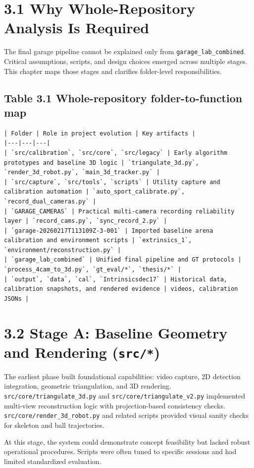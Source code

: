 \section{3.1 Why Whole-Repository Analysis Is Required}
The final garage pipeline cannot be explained only from \texttt{garage\_lab\_combined}. Critical assumptions, scripts, and design choices emerged across multiple stages. This chapter maps those stages and clarifies folder-level responsibilities.

\subsection{Table 3.1 Whole-repository folder-to-function map}
\begin{verbatim}
| Folder | Role in project evolution | Key artifacts |
|---|---|---|
| `src/calibration`, `src/core`, `src/legacy` | Early algorithm prototypes and baseline 3D logic | `triangulate_3d.py`, `render_3d_robot.py`, `main_3d_tracker.py` |
| `src/capture`, `src/tools`, `scripts` | Utility capture and calibration automation | `auto_sport_calibrate.py`, `record_dual_cameras.py` |
| `GARAGE_CAMERAS` | Practical multi-camera recording reliability layer | `record_cams.py`, `sync_record_2.py` |
| `garage-20260217T113109Z-3-001` | Imported baseline arena calibration and environment scripts | `extrinsics_1`, `environment/reconstruction.py` |
| `garage_lab_combined` | Unified final pipeline and GT protocols | `process_4cam_to_3d.py`, `gt_eval/*`, `thesis/*` |
| `output`, `data`, `cal`, `Intrinsicsdec17` | Historical data, calibration snapshots, and rendered evidence | videos, calibration JSONs |
\end{verbatim}

\section{3.2 Stage A: Baseline Geometry and Rendering (\texttt{src/*})}
The earliest phase built foundational capabilities: video capture, 2D detection integration, geometric triangulation, and 3D rendering. \texttt{src/core/triangulate\_3d.py} and \texttt{src/core/triangulate\_v2.py} implemented multi-view reconstruction logic with projection-based consistency checks. \texttt{src/core/render\_3d\_robot.py} and related scripts provided visual sanity checks for skeleton and ball trajectories.

At this stage, the system could demonstrate concept feasibility but lacked robust operational procedures. Scripts were often tuned to specific sessions and had limited standardized evaluation.

